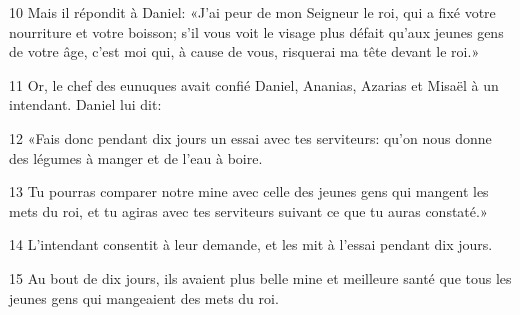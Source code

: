 
10 Mais il répondit à Daniel: «J’ai peur de mon Seigneur le roi, qui a fixé votre nourriture et votre boisson; s’il vous voit le visage plus défait qu’aux jeunes gens de votre âge, c’est moi qui, à cause de vous, risquerai ma tête devant le roi.»

11 Or, le chef des eunuques avait confié Daniel, Ananias, Azarias et Misaël à un intendant. Daniel lui dit:

12 «Fais donc pendant dix jours un essai avec tes serviteurs: qu’on nous donne des légumes à manger et de l’eau à boire.

13 Tu pourras comparer notre mine avec celle des jeunes gens qui mangent les mets du roi, et tu agiras avec tes serviteurs suivant ce que tu auras constaté.»

14 L’intendant consentit à leur demande, et les mit à l’essai pendant dix jours.

15 Au bout de dix jours, ils avaient plus belle mine et meilleure santé que tous les jeunes gens qui mangeaient des mets du roi.